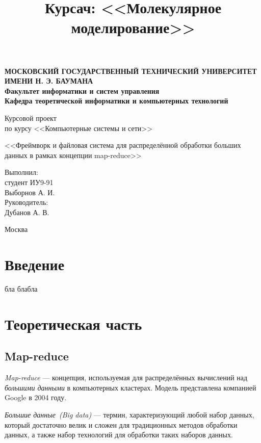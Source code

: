 \documentclass[12pt,a4paper,oneside]{extarticle}
\title{Курсач: <<Молекулярное моделирование>>}
\begin{document}
\pgfplotsset{compat=1.8}

\thispagestyle{empty}
\newpage
{
\centering


\textbf{
МОСКОВСКИЙ ГОСУДАРСТВЕННЫЙ ТЕХНИЧЕСКИЙ УНИВЕРСИТЕТ ИМЕНИ Н. Э. БАУМАНА \\
Факультет информатики и систем управления \\
Кафедра теоретической информатики и компьютерных технологий}
\bigskip
\bigskip
\bigskip
\bigskip
\bigskip
\bigskip
\bigskip

\vfill


Курсовой проект \\
по курсу <<Компьютерные системы и сети>>

\bigskip

{\large <<Фреймворк и файловая система для распределённой обработки больших данных в рамках концепции map-reduce>>}
\bigskip

\vfill



\hfill\parbox{4cm} {
Выполнил:\\
студент ИУ9-91 \hfill \\
Выборнов А. И.\hfill \medskip\\
Руководитель:\\
Дубанов А. В.\hfill
}


\vspace{\fill}

Москва \number\year
\clearpage
}


\tableofcontents

\clearpage


\section*{Введение}
   бла блабла
\clearpage

\section{Теоретическая часть}
    \subsection{Map-reduce}
        {\it Map-reduce} --- концепция, используемая для распределённых вычислений над {\it большими данными} в компьютерных кластерах. Модель представлена компанией Google в 2004 году.

        {\it Большие данные~(Big data)} --- термин, характеризующий любой набор данных, который достаточно велик и сложен для традиционных методов обработки данных, а также набор технологий для обработки таких наборов данных.
        
\end{document}
